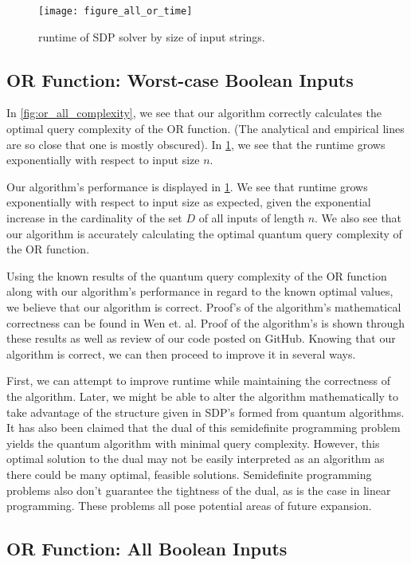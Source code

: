 \begin{figure}[ht]
\centering
\texttt{[image: figure\_all\_or\_time]}
\caption{runtime of SDP solver by size of input strings.}
\label{fig:or_all_runtime}
\end{figure}

\subsection{OR Function: Worst-case Boolean Inputs}\label{sec:speed}
In \cref{fig:or_all_complexity}, we see that our algorithm
correctly calculates the optimal query complexity of the OR function.
(The analytical and empirical lines are so close that one
is mostly obscured).
In \cref{fig:or_all_runtime}, we see that the runtime grows
exponentially with respect to input size $n$.

Our algorithm's performance is displayed in \cref{fig:or_all_runtime}.
We see that runtime grows exponentially with respect to input size as expected, 
given the exponential increase in the cardinality of the set $D$ of all
inputs of length $n$. 
We also see that our algorithm is accurately calculating the
optimal quantum query complexity of the OR function. 

Using the known results of the quantum query
complexity of the OR function along with our
algorithm's performance in regard to the known
optimal values, we believe that our algorithm is
correct. Proof's of the algorithm's mathematical
correctness can be found in Wen et. al. Proof of the
algorithm's is shown through these results as well as
review of our code posted on GitHub. Knowing that our
algorithm is correct, we can then proceed to improve
it in several ways. 

First, we can attempt to improve runtime while
maintaining the correctness of the algorithm. Later,
we might be able to alter the algorithm
mathematically to take advantage of the structure
given in SDP's formed from quantum algorithms. 
It has also been claimed that the dual of this semidefinite
programming problem yields the quantum algorithm with minimal query complexity.
However, this optimal solution to the dual may not be easily 
interpreted as an algorithm as there could be many optimal, feasible solutions. 
Semidefinite programming problems also don't guarantee the tightness of the dual,
as is the case in linear programming. 
These problems all pose potential areas of future expansion.

\subsection{OR Function: All Boolean Inputs}


